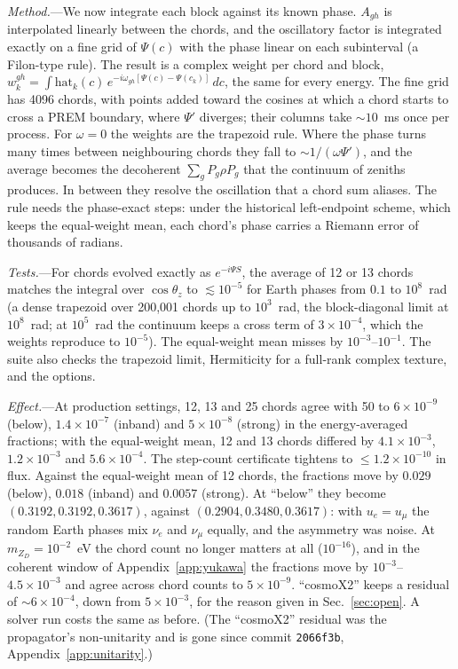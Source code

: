 \documentclass[11pt,a4paper]{article}
\newcommand{\mzd}{m_{Z_D}}
\begin{document}
\textit{Method.}---We now integrate each block against its known phase. $A_{gh}$ is interpolated
linearly between the chords, and the oscillatory factor is integrated exactly on a fine grid of
$\Psi(c)$ with the phase linear on each subinterval (a Filon-type rule). The result is a complex
weight per chord and block,
$w_k^{gh} = \int \mathrm{hat}_k(c)\,e^{-i\omega_{gh}[\Psi(c)-\Psi(c_k)]}\,dc$, the same for
every energy. The fine grid has 4096 chords, with points added toward the cosines at which a chord
starts to cross a PREM boundary, where $\Psi'$ diverges; their columns take $\sim10$~ms once per
process. For $\omega = 0$ the weights are the trapezoid rule. Where the phase turns many times
between neighbouring chords they fall to $\sim1/(\omega\Psi')$, and the average becomes the
decoherent $\sum_g P_g\rho P_g$ that the continuum of zeniths produces. In between they resolve
the oscillation that a chord sum aliases. The rule needs the phase-exact steps: under the
historical left-endpoint scheme, which keeps the equal-weight mean, each chord's phase carries a
Riemann error of thousands of radians.

\textit{Tests.}---For chords evolved exactly as $e^{-i\Psi S}$, the average of 12 or 13 chords
matches the integral over $\cos\theta_z$ to $\lesssim10^{-5}$ for Earth phases from $0.1$ to
$10^8$~rad (a dense trapezoid over 200,001 chords up to $10^3$~rad, the block-diagonal limit at
$10^8$~rad; at $10^5$~rad the continuum keeps a cross term of $3\times10^{-4}$, which the weights
reproduce to $10^{-5}$). The equal-weight mean misses by $10^{-3}$--$10^{-1}$. The suite also
checks the trapezoid limit, Hermiticity for a full-rank complex texture, and the options.

\textit{Effect.}---At production settings, 12, 13 and 25 chords agree with 50 to $6\times10^{-9}$
(below), $1.4\times10^{-7}$ (inband) and $5\times10^{-8}$ (strong) in the energy-averaged
fractions; with the equal-weight mean, 12 and 13 chords differed by $4.1\times10^{-3}$,
$1.2\times10^{-3}$ and $5.6\times10^{-4}$. The step-count certificate tightens to
$\le1.2\times10^{-10}$ in flux. Against the equal-weight mean of 12 chords, the fractions move by
$0.029$ (below), $0.018$ (inband) and $0.0057$ (strong). At ``below'' they become
$(0.3192, 0.3192, 0.3617)$, against $(0.2904, 0.3480, 0.3617)$: with $u_e = u_\mu$ the random
Earth phases mix $\nu_e$ and $\nu_\mu$ equally, and the asymmetry was noise. At
$\mzd = 10^{-2}$~eV the chord count no longer matters at all ($10^{-16}$), and in the coherent
window of Appendix~\ref{app:yukawa} the fractions move by $10^{-3}$--$4.5\times10^{-3}$ and agree
across chord counts to $5\times10^{-9}$. ``cosmoX2'' keeps a residual of $\sim6\times10^{-4}$, down
from $5\times10^{-3}$, for the reason given in Sec.~\ref{sec:open}. A solver run costs the same
as before. (The ``cosmoX2'' residual was the propagator's non-unitarity and is gone since commit
\texttt{2066f3b}, Appendix~\ref{app:unitarity}.)
\end{document}
